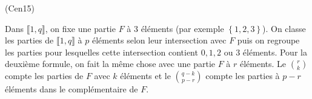 \begin{tiny}(Cen15)\end{tiny} Dans $\llbracket 1,q\rrbracket$, on fixe une partie $F$ à 3 éléments (par exemple $\left\lbrace 1,2,3\right\rbrace$). On classe les parties de $\llbracket 1,q\rrbracket$ à $p$ éléments selon leur intersection avec $F$ puis on regroupe les parties pour lesquelles cette intersection contient $0,1,2$ ou $3$ éléments.\newline
Pour la deuxième formule, on fait la même chose avec une partie $F$ à $r$ éléments. Le $\binom{r}{k}$ compte les parties de $F$ avec $k$ éléments et le $\binom{q-k}{p-r}$ compte les parties à $p-r$ éléments dans le complémentaire de $F$.